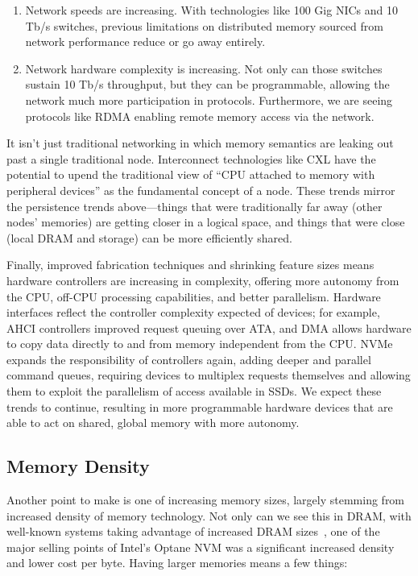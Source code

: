 \begin{enumerate}
    \item Network speeds are increasing. With technologies like 100 Gig NICs and 10 Tb/s switches, previous limitations on distributed memory sourced from network performance reduce or go away entirely.
    \item Network hardware complexity is increasing. Not only can those switches sustain 10 Tb/s throughput, but they can be programmable, allowing the network much more participation in
          protocols. Furthermore, we are seeing protocols like RDMA enabling remote memory access via the network.
\end{enumerate}

It isn't just traditional networking in which memory semantics are leaking out past a single traditional node. Interconnect technologies like CXL have the potential to upend the
traditional view of ``CPU attached to memory with peripheral devices'' as the fundamental concept of a node. These trends mirror the persistence trends above---things that were traditionally far away (other nodes' memories) are getting closer in a logical space, and
things that were close (local DRAM and storage) can be more efficiently shared.

Finally, improved fabrication techniques and shrinking feature
sizes means hardware controllers are increasing in complexity, offering more autonomy from the CPU,
off-CPU processing capabilities, and better parallelism. Hardware interfaces reflect the controller
complexity expected of devices; for example, AHCI controllers improved request queuing over ATA, and DMA
allows hardware to copy data directly to and from memory independent from the CPU. NVMe
expands the responsibility of controllers again, adding deeper and parallel command queues, requiring
devices to multiplex requests themselves and allowing them to exploit the parallelism of access
available in SSDs. We expect these trends to continue, resulting in more programmable hardware
devices that are able to act on shared, global memory with more autonomy.

\subsection{Memory Density}

Another point to make is one of increasing memory sizes, largely stemming from increased density of memory technology.
Not only can we see this in DRAM, with well-known systems taking advantage of
increased DRAM sizes~\cite{ousterhout15}, one of the major selling points of Intel's Optane NVM was a significant
increased density and lower cost per byte. Having larger memories means a few things:

